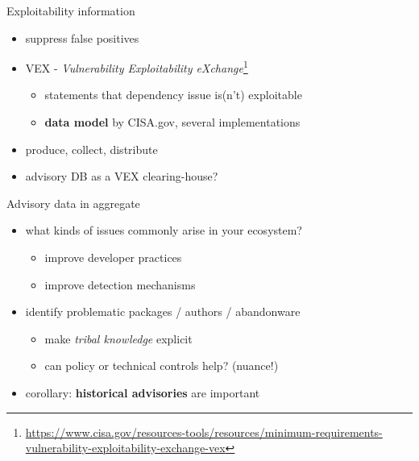 \documentclass[ignorenonframetext,aspectratio=169,12pt]{beamer}
\begin{document}
\begin{frame}{Exploitability information}
  \begin{itemize}
    \item suppress false positives
    \item VEX - {\em Vulnerability Exploitability
      eXchange}\footnote{\url{https://www.cisa.gov/resources-tools/resources/minimum-requirements-vulnerability-exploitability-exchange-vex}}
      \begin{itemize}
        \item statements that dependency issue is(n't) exploitable
        \item {\bf data model} by CISA.gov, several implementations
      \end{itemize}
    \item produce, collect, distribute
    \item advisory DB as a VEX clearing-house?
  \end{itemize}
\end{frame}

\begin{frame}{Advisory data in aggregate}
  \begin{itemize}
    \item what kinds of issues commonly arise in your ecosystem?
      \begin{itemize}
        \item improve developer practices
        \item improve detection mechanisms
      \end{itemize}
    \item identify problematic packages / authors / abandonware
      \begin{itemize}
        \item make {\em tribal knowledge} explicit
        \item can policy or technical controls help? (nuance!)
      \end{itemize}
    \item corollary: {\bf historical advisories} are important
  \end{itemize}
\end{frame}
\end{document}
